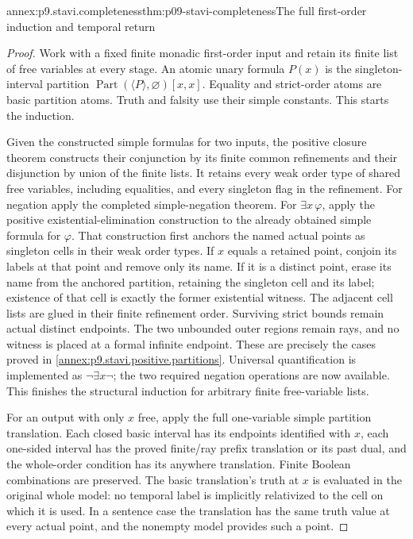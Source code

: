 \begin{annexitem}{annex:p9.stavi.completeness}{thm:p09-stavi-completeness}{The full first-order induction and temporal return}
\begin{proof}
Work with a fixed finite
monadic first-order input
and retain its finite list
of free variables at every
stage. An atomic unary
formula \(P(x)\) is the
singleton-interval partition
\(\operatorname{Part}(\langle P\rangle,\varnothing)[x,x]\).
Equality and strict-order
atoms are basic partition
atoms. Truth and falsity
use their simple constants.
This starts the induction.

Given the constructed
simple formulas for two
inputs, the positive
closure theorem constructs
their conjunction by its
finite common refinements
and their disjunction by
union of the finite lists.
It retains every weak
order type of shared
free variables, including
equalities, and every
singleton flag in the
refinement. For negation
apply the completed
simple-negation theorem.
For \(\exists x\,\varphi\),
apply the positive
existential-elimination
construction to the
already obtained simple
formula for \(\varphi\).
That construction first
anchors the named actual
points as singleton
cells in their weak
order types. If \(x\)
equals a retained point,
conjoin its labels at
that point and remove
only its name. If it
is a distinct point,
erase its name from
the anchored partition,
retaining the singleton
cell and its label;
existence of that cell
is exactly the former
existential witness.
The adjacent cell lists
are glued in their
finite refinement order.
Surviving strict bounds
remain actual distinct
endpoints. The two
unbounded outer regions
remain rays, and no
witness is placed at
a formal infinite
endpoint. These are
precisely the cases
proved in
\cref{annex:p9.stavi.positive.partitions}.
Universal quantification
is implemented as
\(\neg\exists x\neg\);
the two required
negation operations
are now available.
This finishes the
structural induction
for arbitrary finite
free-variable lists.

For an output with
only \(x\) free,
apply the full
one-variable simple
partition translation.
Each closed basic
interval has its
endpoints identified
with \(x\), each
one-sided interval
has the proved
finite/ray prefix
translation or its
past dual, and the
whole-order condition
has its anywhere
translation. Finite
Boolean combinations
are preserved. The
basic translation's
truth at \(x\) is
evaluated in the
original whole model:
no temporal label
is implicitly
relativized to the
cell on which it
is used. In a
sentence case the
translation has the
same truth value
at every actual
point, and the
nonempty model
provides such a
point.


\end{proof}
\end{annexitem}
